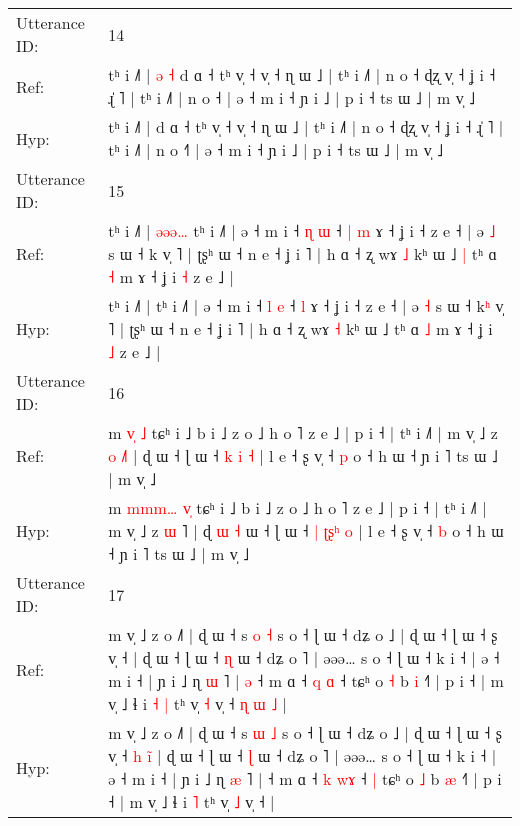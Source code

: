 \documentclass[10pt]{article}
\DeclareRobustCommand{\hl}[1]{{\textcolor{red}{#1}}}
\begin{document}
\begin{longtable}{ll}
 \\
\midrule
Utterance ID: & 14 \\
Ref: & tʰ i ˩˥ |\hl{ }\hl{ə}\hl{ }\hl{˧} d ɑ ˧ tʰ v̩ ˧ v̩ ˧ ɳ ɯ ˩ | tʰ i ˩˥ | n o ˧ ɖʐ v̩ ˧ ʝ i ˧ ɻ̍ ˥ | tʰ i ˩˥ | n o ˧\hl{} | ə ˧ m i ˧ ɲ i ˩ | p i ˧ ts ɯ ˩ | m v̩ ˩
 \\
Hyp: & tʰ i ˩˥ |\hl{}\hl{}\hl{}\hl{} d ɑ ˧ tʰ v̩ ˧ v̩ ˧ ɳ ɯ ˩ | tʰ i ˩˥ | n o ˧ ɖʐ v̩ ˧ ʝ i ˧ ɻ̍ ˥ | tʰ i ˩˥ | n o ˧\hl{˥} | ə ˧ m i ˧ ɲ i ˩ | p i ˧ ts ɯ ˩ | m v̩ ˩
 \\
\midrule
Utterance ID: & 15 \\
Ref: & tʰ i ˩˥ |\hl{ }\hl{ə}\hl{ə}\hl{ə}\hl{…} tʰ i ˩˥ | ə ˧ m i ˧ \hl{ɳ} \hl{ɯ} ˧\hl{ }\hl{|} \hl{m} ɤ ˧ ʝ i ˧ z e ˧ | ə \hl{˩} s ɯ ˧ k\hl{} v̩ ˥ | ʈʂʰ ɯ ˧ n e ˧ ʝ i ˥ | h ɑ ˧ ʐ wɤ \hl{˩} kʰ ɯ ˩\hl{ }\hl{|} tʰ ɑ \hl{˧} m ɤ ˧ ʝ i \hl{˧} z e ˩ |
 \\
Hyp: & tʰ i ˩˥ |\hl{}\hl{}\hl{}\hl{}\hl{} tʰ i ˩˥ | ə ˧ m i ˧ \hl{l} \hl{e} ˧\hl{}\hl{} \hl{l} ɤ ˧ ʝ i ˧ z e ˧ | ə \hl{˧} s ɯ ˧ k\hl{ʰ} v̩ ˥ | ʈʂʰ ɯ ˧ n e ˧ ʝ i ˥ | h ɑ ˧ ʐ wɤ \hl{˧} kʰ ɯ ˩\hl{}\hl{} tʰ ɑ \hl{˩} m ɤ ˧ ʝ i \hl{˩} z e ˩ |
 \\
\midrule
Utterance ID: & 16 \\
Ref: & m \hl{}\hl{}\hl{v}\hl{̩} \hl{}\hl{˩} tɕʰ i ˩ b i ˩ z o ˩ h o ˥ z e ˩ | p i ˧ | tʰ i ˩˥ | m v̩ ˩ z \hl{o} \hl{˩}˥ | ɖ\hl{}\hl{}\hl{}\hl{} ɯ ˧ ɭ ɯ ˧ \hl{k} \hl{}\hl{}\hl{i} \hl{˧} | l e ˧ ʂ v̩ ˧ \hl{p} o ˧ h ɯ ˧ ɲ i ˥ ts ɯ ˩ | m v̩ ˩
 \\
Hyp: & m \hl{m}\hl{m}\hl{m}\hl{…} \hl{v}\hl{̩} tɕʰ i ˩ b i ˩ z o ˩ h o ˥ z e ˩ | p i ˧ | tʰ i ˩˥ | m v̩ ˩ z \hl{ɯ} \hl{}˥ | ɖ\hl{ }\hl{ɯ}\hl{ }\hl{˧} ɯ ˧ ɭ ɯ ˧ \hl{|} \hl{ʈ}\hl{ʂ}\hl{ʰ} \hl{o} | l e ˧ ʂ v̩ ˧ \hl{b} o ˧ h ɯ ˧ ɲ i ˥ ts ɯ ˩ | m v̩ ˩
 \\
\midrule
Utterance ID: & 17 \\
Ref: & m v̩ ˩ z o ˩˥ | ɖ ɯ ˧ s \hl{o} \hl{˧} s o ˧ ɭ ɯ ˧ dʑ o ˩ | ɖ ɯ ˧ ɭ ɯ ˧ ʂ v̩ ˧\hl{}\hl{}\hl{}\hl{}\hl{} | ɖ ɯ ˧ ɭ ɯ ˧ \hl{ɳ} ɯ ˧ dʑ o ˥ | əəə… s o ˧ ɭ ɯ ˧ k i ˧ | ə ˧ m i ˧ | ɲ i ˩ ɳ \hl{ɯ} ˥ |\hl{ }\hl{ə} ˧ m ɑ ˧ \hl{q} \hl{}\hl{ɑ} ˧\hl{}\hl{} tɕʰ o \hl{˧} b \hl{i} ˧˥ | p i ˧ | m v̩ ˩ ɬ i\hl{ }\hl{˧} \hl{|} tʰ v̩ \hl{˧} v̩ ˧\hl{ }\hl{ɳ}\hl{ }\hl{ɯ}\hl{ }\hl{˩} |
 \\
Hyp: & m v̩ ˩ z o ˩˥ | ɖ ɯ ˧ s \hl{ɯ} \hl{˩} s o ˧ ɭ ɯ ˧ dʑ o ˩ | ɖ ɯ ˧ ɭ ɯ ˧ ʂ v̩ ˧\hl{ }\hl{h}\hl{ }\hl{i}\hl{̃} | ɖ ɯ ˧ ɭ ɯ ˧ \hl{ɭ} ɯ ˧ dʑ o ˥ | əəə… s o ˧ ɭ ɯ ˧ k i ˧ | ə ˧ m i ˧ | ɲ i ˩ ɳ \hl{æ} ˥ |\hl{}\hl{} ˧ m ɑ ˧ \hl{k} \hl{w}\hl{ɤ} ˧\hl{ }\hl{|} tɕʰ o \hl{˩} b \hl{æ} ˧˥ | p i ˧ | m v̩ ˩ ɬ i\hl{}\hl{} \hl{˥} tʰ v̩ \hl{˩} v̩ ˧\hl{}\hl{}\hl{}\hl{}\hl{}\hl{} |

\end{longtable}
\end{document}
